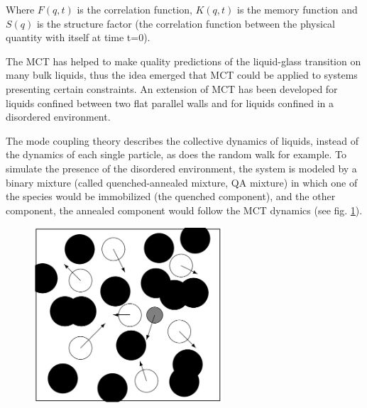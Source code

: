 \documentclass[a4paper,12pt]{article}
\newcommand{\jline}{\vspace{10pt}}
\begin{document}
Where $F(q,t)$ is the correlation function, $K(q,t)$ is the memory function and $S(q)$ is the structure factor (the correlation function between the physical quantity with itself at time t=0).\jline

The MCT has helped to make quality predictions of the liquid-glass transition on many bulk liquids, thus the idea emerged that MCT could be applied to systems presenting certain constraints. An extension of MCT has been developed for liquids confined between two flat parallel walls \cite{Lang2012} and for liquids confined in a disordered environment.\jline

The mode coupling theory describes the collective dynamics of liquids, instead of the dynamics of each single particle, as does the random walk for example. To simulate the presence of the disordered environment, the system is modeled by a binary mixture (called quenched-annealed mixture, QA mixture) in which one of the species would be immobilized (the quenched component), and the other component, the annealed component would follow the MCT dynamics (see fig. \ref{qa mixture}).

\begin{figure}[htbp]
\centering
\subfigure
{\includegraphics[width=7cm]{pics/qa_mixtures.png}}
\caption{}
\label{qa mixture}
\end{figure}

\newpage


\end{document}
